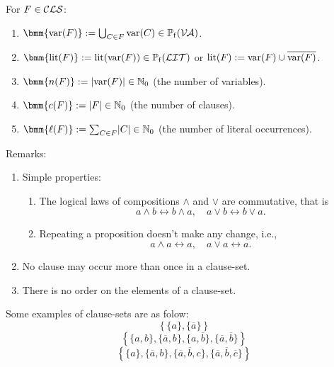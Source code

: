\documentclass[12pt]{book}
\begin{document}
\begin{defi}\label{def:clsbasicops}
  For $F \in \mathcal{CLS}$:
  \begin{enumerate}
  \item $\bmm{\var(F)} := \bc_{C \in F} \var(C) \in \pote(\Va)$.
  \item $\bmm{\lit(F)} := \lit(\var(F)) \in \pote(\Lit)$ or $\operatorname{lit}(F) := \operatorname{var}(F) \cup \overline{\operatorname{var}(F)}$.
  \item $\bmm{n(F)} := \abs{\var(F)} \in \NNZ$ (the number of variables).
  \item $\bmm{c(F)} := \abs{F} \in \NNZ$ (the number of clauses).
  \item $\bmm{\ell(F)} := \sum_{C \in F} \abs{C} \in \NNZ$ (the number of literal occurrences).
  \end{enumerate}
\end{defi}
Remarks:
\begin{enumerate}
\item Simple properties:
  \begin{enumerate}
  \item The logical laws of compositions $\wedge$ and $\vee$ are commutative, that is
  \begin{displaymath}
     a\wedge b \leftrightarrow b\wedge a, \quad  a\vee b \leftrightarrow b\vee a.
  \end{displaymath} 
  \item Repeating a proposition doesn't make any change, i.e.,
     \begin{displaymath}
      a\wedge a \leftrightarrow a, \quad  a\vee a \leftrightarrow a.
    \end{displaymath}
 \end{enumerate}
 \item No clause may occur more than once in a clause-set.
 \item There is no order on the elements of a clause-set.
\end{enumerate}
\begin{examp}\label{exp:cls}
Some examples of clause-sets are as folow:
\begin{displaymath}
     \left\{\{a\}, \{\overline{a}\}\right\}
  \end{displaymath} 
  \begin{displaymath}
     \left\{\{a,b\}, \{\overline{a},b\}, \{a, \overline{b}\}, \{\overline{a},\overline{b}\}\right\}
  \end{displaymath}
  \begin{displaymath}
     \left\{\{a\}, \{\overline{a},b\}, \{\overline{a}, \overline{b}, c\}, \{\overline{a}, \overline{b}, \overline{c}\}\right\}
  \end{displaymath}
\end{examp}
\end{document}
